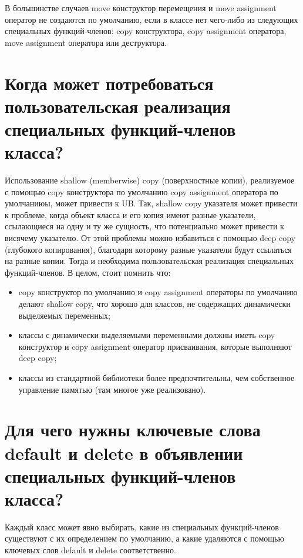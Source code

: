 \documentclass[a4paper,12pt]{article}	%
\begin{document}
	В большинстве случаев move конструктор перемещения и move assignment оператор не создаются по умолчанию, если в классе нет чего-либо из следующих специальных функций-членов: copy конструктора, copy assignment оператора, move assignment оператора или деструктора.

\newpage

\section{Когда может потребоваться пользовательская реализация специальных функций-членов класса?}

	Использование shallow (memberwise) copy (поверхностные копии), реализуемое с помощью copy конструктора по умолчанию copy assignment оператора по умолчаниюы, может привести к UB. Так, shallow copy указателя может привести к проблеме, когда объект класса и его копия имеют разные указатели, ссылающиеся на одну и ту же сущность, что потенциально может привести к висячему указателю. От этой проблемы можно избавиться с помощью deep copy (глубокого копирования), благодаря которому разные указатели будут ссылаться на разные копии. Тогда и необходима пользовательская реализация специальных функций-членов. В целом, стоит помнить что:
	
	\begin{itemize}
	
	\item copy конструктор по умолчанию и copy assignment операторы по умолчанию делают shallow copy, что хорошо для классов, не содержащих динамически выделяемых переменных;
	
	\item классы с динамически выделяемыми переменными должны иметь copy конструктор и copy assignment оператор присваивания, которые выполняют deep copy;
	
	\item классы из стандартной библиотеки более предпочтительны, чем собственное управление памятью (там многое уже реализовано).

	\end{itemize}

\newpage

\section{Для чего нужны ключевые слова default и delete в объявлении специальных функций-членов класса?}

	Каждый класс может явно выбирать, какие из специальных функций-членов существуют с их определением по умолчанию, а какие удаляются с помощью ключевых слов default и delete соответственно.
\end{document}
